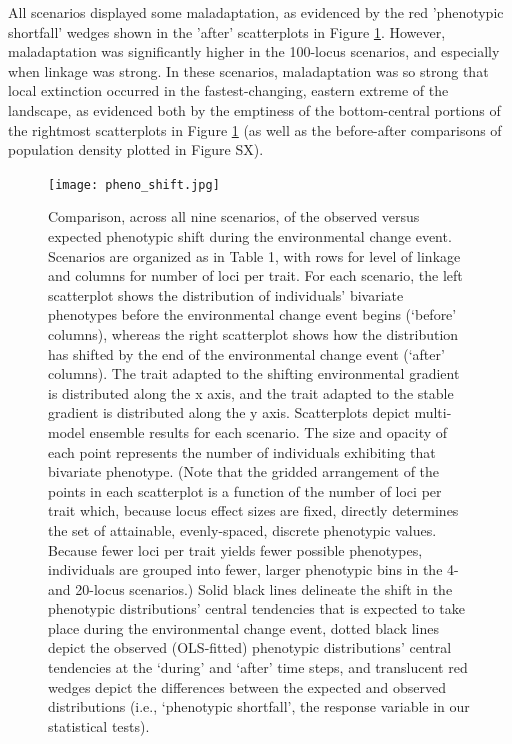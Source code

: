 \documentclass[9pt,twocolumn,twoside,lineno]{pnas-new}
\begin{document}
All scenarios displayed some maladaptation, as evidenced by the red 'phenotypic shortfall' wedges shown in the 'after' scatterplots in Figure \ref{fig:pheno_shift}. However, maladaptation was significantly higher in the 100-locus scenarios, and especially when linkage was strong.
In these scenarios, maladaptation was so strong that local extinction occurred
in the fastest-changing, eastern extreme of the landscape,
as evidenced both by the emptiness of the bottom-central portions
of the rightmost scatterplots in Figure \ref{fig:pheno_shift}
(as well as the before-after comparisons of population density plotted in
Figure SX).


\begin{figure}
\centering
\texttt{[image: pheno\_shift.jpg]}
\caption{Comparison, across all nine scenarios, of the observed versus expected phenotypic shift during the environmental change event. Scenarios are organized as in Table 1, with rows for level of linkage and columns for number of loci per trait. For each scenario, the left scatterplot shows the distribution of individuals’ bivariate phenotypes before the environmental change event begins (‘before’ columns), whereas the right scatterplot shows how the distribution has shifted by the end of the environmental change event (‘after’ columns). The trait adapted to the shifting environmental gradient is distributed along the x axis, and the trait adapted to the stable gradient is distributed along the y axis. Scatterplots depict multi-model ensemble results for each scenario. The size and opacity of each point represents the number of individuals exhibiting that bivariate phenotype. (Note that the gridded arrangement of the points in each scatterplot is a function of the number of loci per trait which, because locus effect sizes are fixed, directly determines the set of attainable, evenly-spaced, discrete phenotypic values. Because fewer loci per trait yields fewer possible phenotypes, individuals are grouped into fewer, larger phenotypic bins in the 4- and 20-locus scenarios.) Solid black lines delineate the shift in the phenotypic distributions’ central tendencies that is expected to take place during the environmental change event, dotted black lines depict the observed (OLS-fitted) phenotypic distributions’ central tendencies at the ‘during’ and ‘after’ time steps, and translucent red wedges depict the differences between the expected and observed distributions (i.e., ‘phenotypic shortfall’, the response variable in our statistical tests).
}
\label{fig:pheno_shift}
\end{figure}
\end{document}
